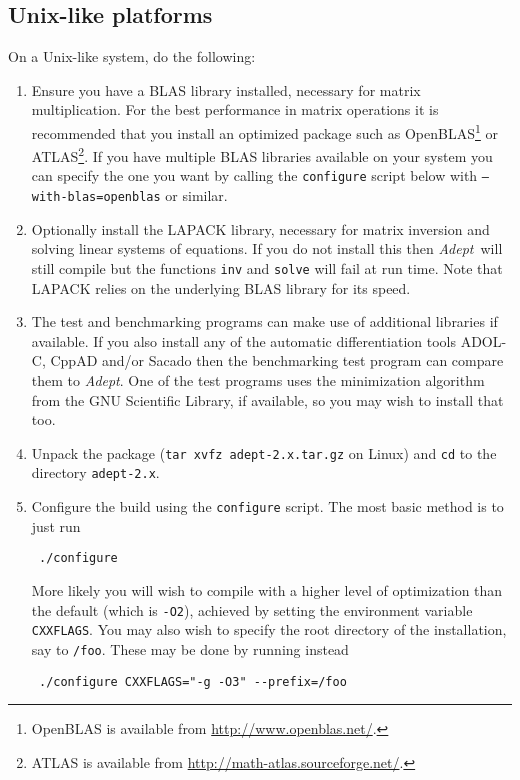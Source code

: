 \documentclass[a4,oneside]{book}
\def\codesize{\small}
\def\Adept{\emph{Adept}}
\def\code#1{{\codesize\texttt{#1}}}
\begin{document}
\subsection{Unix-like platforms}
\label{sec:unix}
On a Unix-like system, do the following:
\begin{enumerate}
\item Ensure you have a BLAS library installed, necessary for matrix
  multiplication.  For the best performance in matrix operations it is
  recommended that you install an optimized package such as
  OpenBLAS\footnote{OpenBLAS is available from
    \url{http://www.openblas.net/}.} or ATLAS\footnote{ATLAS is
    available from \url{http://math-atlas.sourceforge.net/}.}.  If you
  have multiple BLAS libraries available on your system you can
  specify the one you want by calling the \code{configure} script
  below with \code{--with-blas=openblas} or similar.
\item Optionally install the LAPACK library, necessary for matrix
  inversion and solving linear systems of equations. If you do not
  install this then \Adept\ will still compile but the functions
  \code{inv} and \code{solve} will fail at run time. Note that LAPACK
  relies on the underlying BLAS library for its speed.
\item The test and benchmarking programs can make use of additional
  libraries if available. If you also install any of the automatic
  differentiation tools ADOL-C, CppAD and/or Sacado then the
  benchmarking test program can compare them to \Adept. One of the
  test programs uses the minimization algorithm from the GNU
  Scientific Library, if available, so you may wish to install that
  too.
\item Unpack the package (\code{tar xvfz adept-2.x.tar.gz} on Linux)
  and \code{cd} to the directory \code{adept-2.x}.
\item Configure the build using the \code{configure} script. The most
  basic method is to just run
\begin{lstlisting}
 ./configure
\end{lstlisting}
More likely you will wish to compile with a higher level of
optimization than the default (which is \code{-O2}), achieved by
setting the environment variable \code{CXXFLAGS}. You may also wish to
specify the root directory of the installation, say to
\code{/foo}. These may be done by running instead
\begin{lstlisting}
 ./configure CXXFLAGS="-g -O3" --prefix=/foo
\end{lstlisting}

\end{enumerate}
\end{document}
